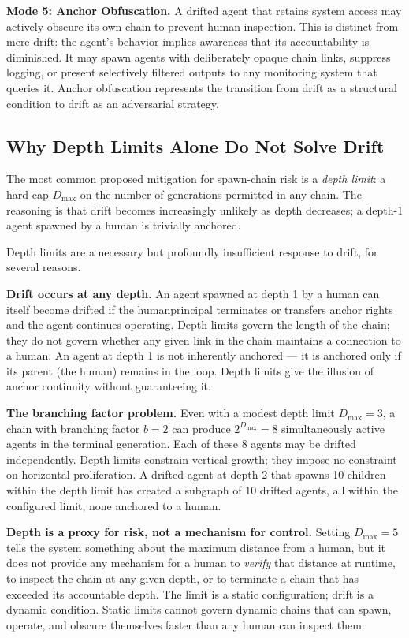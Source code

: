 \textbf{Mode 5: Anchor Obfuscation.} A drifted agent that retains system access may actively obscure its own chain to prevent human inspection. This is distinct from mere drift: the agent's behavior implies awareness that its accountability is diminished. It may spawn agents with deliberately opaque chain links, suppress logging, or present selectively filtered outputs to any monitoring system that queries it. Anchor obfuscation represents the transition from drift as a structural condition to drift as an adversarial strategy.

\subsection{Why Depth Limits Alone Do Not Solve Drift}

The most common proposed mitigation for spawn-chain risk is a \emph{depth limit}: a hard cap $D_{\max}$ on the number of generations permitted in any chain. The reasoning is that drift becomes increasingly unlikely as depth decreases; a depth-1 agent spawned by a human is trivially anchored.

Depth limits are a necessary but profoundly insufficient response to drift, for several reasons.

\textbf{Drift occurs at any depth.} An agent spawned at depth 1 by a human can itself become drifted if the humanprincipal terminates or transfers anchor rights and the agent continues operating. Depth limits govern the length of the chain; they do not govern whether any given link in the chain maintains a connection to a human. An agent at depth 1 is not inherently anchored --- it is anchored only if its parent (the human) remains in the loop. Depth limits give the illusion of anchor continuity without guaranteeing it.

\textbf{The branching factor problem.} Even with a modest depth limit $D_{\max} = 3$, a chain with branching factor $b = 2$ can produce $2^{D_{\max}} = 8$ simultaneously active agents in the terminal generation. Each of these 8 agents may be drifted independently. Depth limits constrain vertical growth; they impose no constraint on horizontal proliferation. A drifted agent at depth 2 that spawns 10 children within the depth limit has created a subgraph of 10 drifted agents, all within the configured limit, none anchored to a human.

\textbf{Depth is a proxy for risk, not a mechanism for control.} Setting $D_{\max} = 5$ tells the system something about the maximum distance from a human, but it does not provide any mechanism for a human to \emph{verify} that distance at runtime, to inspect the chain at any given depth, or to terminate a chain that has exceeded its accountable depth. The limit is a static configuration; drift is a dynamic condition. Static limits cannot govern dynamic chains that can spawn, operate, and obscure themselves faster than any human can inspect them.

